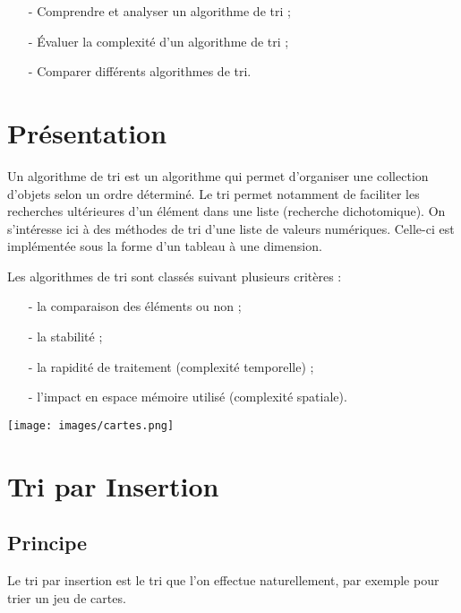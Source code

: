 \documentclass[t,11pt]{article}
\begin{document}
\entetecoursinfo



\begin{obje}
\begin{itemize}
\item[-] Comprendre et analyser un algorithme de tri ;
\item[-] Évaluer la complexité d'un algorithme de tri ;
\item[-] Comparer différents algorithmes de tri.
\end{itemize}
\end{obje}


\section{Présentation}


Un algorithme de tri est un algorithme qui permet d'organiser une collection d'objets selon un ordre déterminé. Le tri permet notamment de faciliter les recherches ultérieures d'un élément dans une liste (recherche dichotomique).
On s'intéresse ici à des méthodes de tri d'une liste de valeurs numériques. Celle-ci est implémentée sous la forme d'un tableau à une dimension.


\begin{minipage}{.65\textwidth}%
Les algorithmes de tri sont classés suivant plusieurs critères :
\begin{itemize}
\item[-] la comparaison des éléments ou non ;
\item[-] la stabilité ;
\item[-] la rapidité de traitement (complexité temporelle) ;
\item[-] l'impact en espace mémoire utilisé (complexité spatiale).
\end{itemize}
\end{minipage}%
\hfill
\begin{minipage}{.3\textwidth}%
\texttt{[image: images/cartes.png]}
\end{minipage}

\section{Tri par Insertion}
\subsection{Principe}

Le tri par insertion est le tri que l'on effectue naturellement, par exemple pour trier un jeu de cartes.
\end{document}
